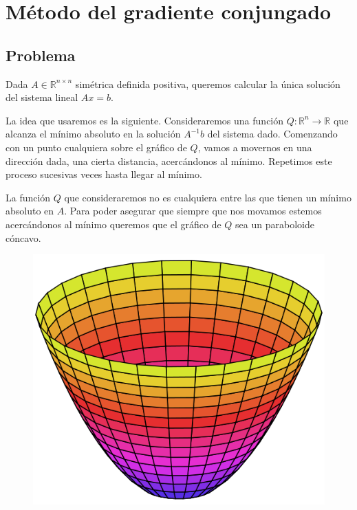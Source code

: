 \section{Método del gradiente conjungado}

\subsection{Problema}

Dada $A \in \mathbb{R}^{n \times n}$ simétrica definida positiva, queremos calcular la única solución del sistema lineal $Ax = b$.

La idea que usaremos es la siguiente. Consideraremos una función $Q : \mathbb{R}^{n} \to \mathbb{R}$ que alcanza el mínimo absoluto en la solución $A^{-1}b$ del sistema dado. Comenzando con un punto cualquiera sobre el gráfico de $Q$, vamos a movernos en una dirección dada, una cierta distancia, acercándonos al mínimo. Repetimos este proceso sucesivas veces hasta llegar al mínimo.

La función $Q$ que consideraremos no es cualquiera entre las que tienen un mínimo absoluto en $A$. Para poder asegurar que siempre que nos movamos estemos acercándonos al mínimo queremos que el gráfico de $Q$ sea un paraboloide cóncavo.


\begin{figure}[h]
\centering
\includegraphics[scale=0.30]{imagenes/paraboloide.png}
\end{figure}

